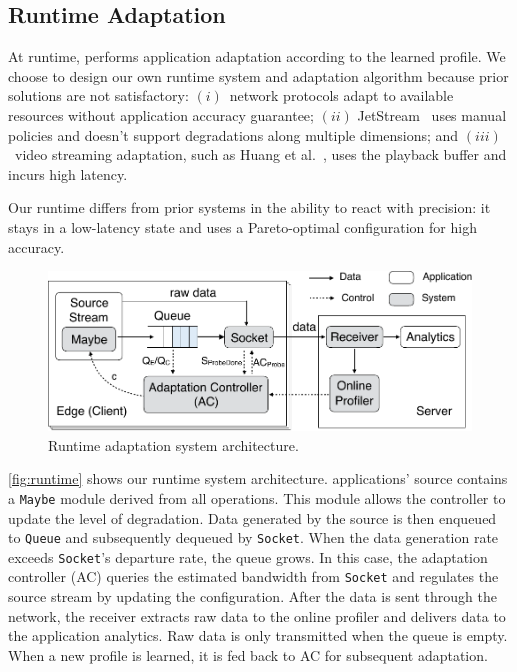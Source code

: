\subsection{Runtime Adaptation}
\label{sec:runtime}

At runtime, \sysname{} performs application adaptation according to the learned
profile. We choose to design our own runtime system and adaptation algorithm
because prior solutions are not satisfactory: $(i)$~network protocols adapt to
available resources without application accuracy guarantee; $(ii)$
JetStream~\cite{rabkin2014aggregation} uses manual policies and doesn't support
degradations along multiple dimensions; and $(iii)$~video streaming adaptation,
such as Huang et al.~\cite{huang2014buffer}, uses the playback buffer and incurs
high latency.

Our runtime differs from prior systems in the ability to react
with precision: it stays in a low-latency state and uses a Pareto-optimal
configuration for high accuracy.

\begin{figure}
  \centering
  \includegraphics[width=\linewidth]{figures/runtime-adaptation.pdf}
  \caption{Runtime adaptation system architecture.}
  \label{fig:runtime}
\end{figure}

\autoref{fig:runtime} shows our runtime system architecture. \sysname{}
applications' source contains a \texttt{Maybe} module derived from all \maybe{}
operations. This module allows the controller to update the level of
degradation. Data generated by the source is then enqueued to \texttt{Queue} and
subsequently dequeued by \texttt{Socket}. When the data generation rate exceeds
\texttt{Socket}'s departure rate, the queue grows. In this case, the adaptation
controller (AC) queries the estimated bandwidth from \texttt{Socket} and
regulates the source stream by updating the configuration.  After the data is
sent through the network, the receiver extracts raw data to the online profiler
and delivers data to the application analytics. Raw data is only transmitted
when the queue is empty. When a new profile is learned, it is fed back to AC for
subsequent adaptation.

